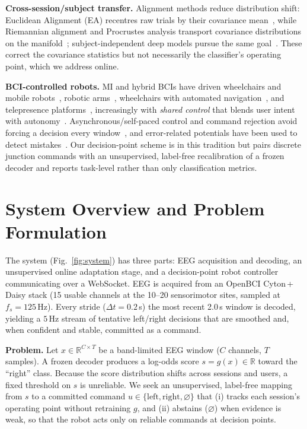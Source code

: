 \documentclass[10pt,journal]{IEEEtran}
\begin{document}
\textbf{Cross-session/subject transfer.} Alignment methods reduce distribution shift: Euclidean
Alignment (EA) recentres raw trials by their covariance mean~\cite{he2020ea}, while Riemannian
alignment and Procrustes analysis transport covariance distributions on the
manifold~\cite{zanini2018transfer,rodrigues2019rpa}; subject-independent deep models pursue the
same goal~\cite{kwon2020subjectindependent,wu2022transferreview}. These correct the covariance
statistics but not necessarily the classifier's operating point, which we address online.

\textbf{BCI-controlled robots.} MI and hybrid BCIs have driven wheelchairs and mobile
robots~\cite{millan2004mobilerobot,galan2008wheelchair,tsui2011selfpaced,carlson2013wheelchair,zhang2021survey},
robotic arms~\cite{meng2016robotarm,edelman2019scirobotics}, wheelchairs with automated
navigation~\cite{iturrate2009wheelchair}, and telepresence
platforms~\cite{leeb2015telepresence}, increasingly with \emph{shared control} that blends user
intent with autonomy~\cite{carlson2013wheelchair,xu2023sharedcontrol,tonin2021review}.
Asynchronous/self-paced control and command rejection avoid forcing a decision every
window~\cite{mason2000switch,tsui2011selfpaced}, and error-related potentials have been used to
detect mistakes~\cite{ferrez2008errp,chavarriaga2010errp}. Our decision-point scheme is in this
tradition but pairs discrete junction commands with an unsupervised, label-free recalibration of
a frozen decoder and reports task-level rather than only classification metrics.

\section{System Overview and Problem Formulation}
The system (Fig.~\ref{fig:system}) has three parts: EEG acquisition and decoding, an
unsupervised online adaptation stage, and a decision-point robot controller communicating over a
WebSocket. EEG is acquired from an OpenBCI Cyton\,+\,Daisy stack (15 usable channels at the
10--20 sensorimotor sites, sampled at $f_s=125$\,Hz). Every stride ($\Delta t = 0.2$\,s) the most
recent 2.0\,s window is decoded, yielding a $5$\,Hz stream of tentative left/right decisions that
are smoothed and, when confident and stable, committed as a command.

\textbf{Problem.} Let $x\in\mathbb{R}^{C\times T}$ be a band-limited EEG window ($C$ channels,
$T$ samples). A frozen decoder produces a log-odds score $s = g(x)\in\mathbb{R}$ toward the
``right'' class. Because the score distribution shifts across sessions and users, a fixed
threshold on $s$ is unreliable. We seek an unsupervised, label-free mapping from $s$ to a
committed command $u\in\{\text{left},\text{right},\varnothing\}$ that (i) tracks each session's
operating point without retraining $g$, and (ii) abstains ($\varnothing$) when evidence is weak,
so that the robot acts only on reliable commands at decision points.
\end{document}

